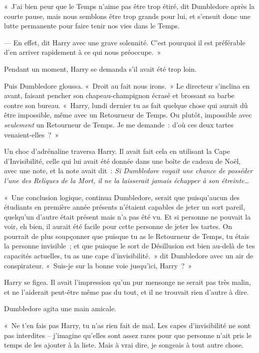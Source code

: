 «~J'ai bien peur que le Temps n'aime pas être trop étiré, dit Dumbledore après la courte pause, mais nous semblons être trop grands pour lui, et s'ensuit donc une lutte permanente pour faire tenir nos vies dans le Temps.

--- En effet, dit Harry avec une grave solennité. C'est pourquoi il est préférable d'en arriver rapidement à ce qui nous préoccupe.~»

Pendant un moment, Harry se demanda s'il avait été trop loin.

Puis Dumbledore gloussa. «~Droit au fait nous irons.~» Le directeur s'inclina en avant, faisant pencher son chapeau-champignon écrasé et brossant sa barbe contre son bureau. «~Harry, lundi dernier tu as fait quelque chose qui aurait dû être impossible, même avec un Retourneur de Temps. Ou plutôt, impossible avec \emph{seulement} un Retourneur de Temps. Je me demande~: d'où ces deux tartes venaient-elles~?~»

Un choc d'adrénaline traversa Harry. Il avait fait cela en utilisant la Cape d'Invisibilité, celle qui lui avait été donnée dans une boîte de cadeau de Noël, avec une note, et la note avait dit~: \emph{Si Dumbledore voyait une chance de posséder l'une des Reliques de la Mort, il ne la laisserait jamais échapper à son étreinte…}

«~Une conclusion logique, continua Dumbledore, serait que puisqu'aucun des étudiants en première année présents n'étaient capables de jeter un sort pareil, quelqu'un d'autre était présent mais n'a pas été vu. Et si personne ne pouvait la voir, eh bien, il aurait été facile pour cette personne de jeter les tartes. On pourrait de plus soupçonner que puisque tu as le Retourneur de Temps, tu étais la personne invisible~; et que puisque le sort de Désillusion est bien au-delà de tes capacités actuelles, tu as une cape d'invisibilité.~» dit Dumbledore avec un air de conspirateur. «~Suis-je sur la bonne voie jusqu'ici, Harry~?~»

Harry se figea. Il avait l'impression qu'un pur mensonge ne serait pas très malin, et ne l'aiderait peut-être même pas du tout, et il ne trouvait rien d'autre à dire.

Dumbledore agita une main amicale.

«~Ne t'en fais pas Harry, tu n'as rien fait de mal. Les capes d'invisibilité ne sont pas interdites -- j'imagine qu'elles sont assez rares pour que personne n'ait pris le temps de les ajouter à la liste. Mais à vrai dire, je songeais à tout autre chose.

